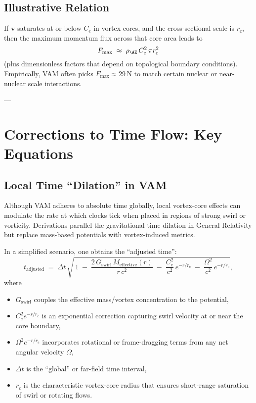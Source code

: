 \subsection{Illustrative Relation}
If \(\mathbf{v}\) saturates at or below \(C_e\) in vortex cores, and the cross-sectional scale is \(r_c\), then the maximum momentum flux across that core area leads to
\[
    F_{\text{max}}
    \;\approx\;
    \rho_{\mathrm{\AE}}\, C_e^2\, \pi r_c^2
\]
(plus dimensionless factors that depend on topological boundary conditions). Empirically, VAM often picks \(F_{\text{max}}\approx 29\,\mathrm{N}\) to match certain nuclear or near-nuclear scale interactions.

---

\section{Corrections to Time Flow: Key Equations}

\subsection{Local Time “Dilation” in VAM}
Although VAM adheres to absolute time globally, local vortex-core effects can modulate the rate at which clocks tick when placed in regions of strong swirl or vorticity. Derivations parallel the gravitational time-dilation in General Relativity but replace mass-based potentials with vortex-induced metrics.

In a simplified scenario, one obtains the “adjusted time”:
\[
    t_{\text{adjusted}}
    \;=\;
    \Delta t \,\sqrt{\,1 \;-\; \frac{2\,G_{\text{swirl}}\,M_{\text{effective}}(r)}{r\,c^2}
    \;-\;
    \frac{C_e^2}{c^2} \, e^{-r/r_c}
        \;-\;
        \frac{\Omega^2}{c^2} \, e^{-r/r_c}
    },
\]
where
\begin{itemize}
    \item \(G_{\text{swirl}}\) couples the effective mass/vortex concentration to the potential,
    \item \(C_e^2 e^{-r/r_c}\) is an exponential correction capturing swirl velocity at or near the core boundary,
    \item \(\Omega^2 e^{-r/r_c}\) incorporates rotational or frame-dragging terms from any net angular velocity \(\Omega\),
    \item \(\Delta t\) is the “global” or far-field time interval,
    \item \(r_c\) is the characteristic vortex-core radius that ensures short-range saturation of swirl or rotating flows.
\end{itemize}

